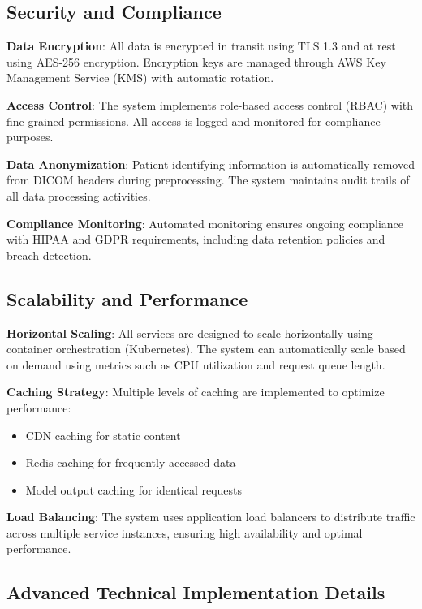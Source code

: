 \documentclass[12pt,a4paper]{article}
\begin{document}
\subsection{Security and Compliance}

\textbf{Data Encryption}: All data is encrypted in transit using TLS 1.3 and at rest using AES-256 encryption. Encryption keys are managed through AWS Key Management Service (KMS) with automatic rotation.

\textbf{Access Control}: The system implements role-based access control (RBAC) with fine-grained permissions. All access is logged and monitored for compliance purposes.

\textbf{Data Anonymization}: Patient identifying information is automatically removed from DICOM headers during preprocessing. The system maintains audit trails of all data processing activities.

\textbf{Compliance Monitoring}: Automated monitoring ensures ongoing compliance with HIPAA and GDPR requirements, including data retention policies and breach detection.

\subsection{Scalability and Performance}

\textbf{Horizontal Scaling}: All services are designed to scale horizontally using container orchestration (Kubernetes). The system can automatically scale based on demand using metrics such as CPU utilization and request queue length.

\textbf{Caching Strategy}: Multiple levels of caching are implemented to optimize performance:
\begin{itemize}
    \item CDN caching for static content
    \item Redis caching for frequently accessed data
    \item Model output caching for identical requests
\end{itemize}

\textbf{Load Balancing}: The system uses application load balancers to distribute traffic across multiple service instances, ensuring high availability and optimal performance.

\subsection{Advanced Technical Implementation Details}
\end{document}
